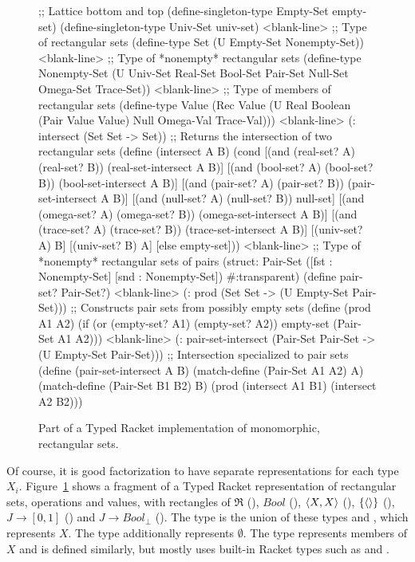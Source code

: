 \begin{figure}[p!]\centering
\begin{schemedisplay}
;; Lattice bottom and top
(define-singleton-type Empty-Set empty-set)
(define-singleton-type Univ-Set univ-set)
<blank-line>
;; Type of rectangular sets
(define-type Set (U Empty-Set Nonempty-Set))
<blank-line>
;; Type of *nonempty* rectangular sets
(define-type Nonempty-Set
  (U Univ-Set Real-Set Bool-Set Pair-Set Null-Set Omega-Set Trace-Set))
<blank-line>
;; Type of members of rectangular sets
(define-type Value
  (Rec Value (U Real Boolean (Pair Value Value) Null Omega-Val Trace-Val)))
<blank-line>
(: intersect (Set Set -> Set))
;; Returns the intersection of two rectangular sets
(define (intersect A B)
  (cond [(and (real-set? A) (real-set? B))  (real-set-intersect A B)]
        [(and (bool-set? A) (bool-set? B))  (bool-set-intersect A B)]
        [(and (pair-set? A) (pair-set? B))  (pair-set-intersect A B)]
        [(and (null-set? A) (null-set? B))  null-set]
        [(and (omega-set? A) (omega-set? B))  (omega-set-intersect A B)]
        [(and (trace-set? A) (trace-set? B))  (trace-set-intersect A B)]
        [(univ-set? A)  B]
        [(univ-set? B)  A]
        [else  empty-set]))
<blank-line>
;; Type of *nonempty* rectangular sets of pairs
(struct: Pair-Set ([fst : Nonempty-Set] [snd : Nonempty-Set])
  #:transparent)
(define pair-set? Pair-Set?)
<blank-line>
(: prod (Set Set -> (U Empty-Set Pair-Set)))
;; Constructs pair sets from possibly empty sets
(define (prod A1 A2)
  (if (or (empty-set? A1) (empty-set? A2))
      empty-set
      (Pair-Set A1 A2)))
<blank-line>
(: pair-set-intersect (Pair-Set Pair-Set -> (U Empty-Set Pair-Set)))
;; Intersection specialized to pair sets
(define (pair-set-intersect A B)
  (match-define (Pair-Set A1 A2) A)
  (match-define (Pair-Set B1 B2) B)
  (prod (intersect A1 B1) (intersect A2 B2)))
\end{schemedisplay}
\bottomhrule
\caption[Typed Racket implementation of rectangular sets]{Part of a Typed Racket implementation of monomorphic, rectangular sets.}
\label{fig:typed-racket-set}
\end{figure}

Of course, it is good factorization to have separate representations for each type $X_i$.
Figure~\ref{fig:typed-racket-set} shows a fragment of a Typed Racket representation of rectangular sets, operations and values, with rectangles of $\Re$ (), $Bool$ (), $\langle{X,X}\rangle$ (), $\{{\langle{}\rangle}\}$ (), $J \to [0,1]$ () and $J \to Bool_\bot$ ().
The type  is the union of these types and , which represents $X$.
The  type additionally represents $\emptyset$.
The  type represents members of $X$ and is defined similarly, but mostly uses built-in Racket types such as  and .

